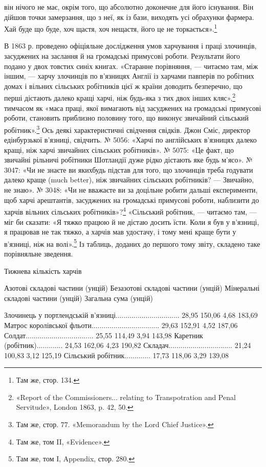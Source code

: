 \parcont{}  %
він нічого не має, окрім того, що абсолютно доконечне для його
існування. Він дійшов точки замерзання, що з неї, як із бази,
виходять усі обрахунки фармера. Хай буде що буде, хоч щастя,
хоч нещастя, його це не торкається».\footnote{
Там же, стор. 134.
}

В 1863 р. проведено офіціяльне дослідження умов харчування
і праці злочинців, засуджених на заслання й на громадські примусові
роботи. Результати його подано у двох товстих синіх
книгах. «Старанне порівняння, — читаємо там, між іншим, —
харчу злочинців по в’язницях Англії із харчами павперів по
робітних домах і вільних сільських робітників цієї ж країни
доводить безперечно, що перші дістають далеко кращі харчі,
ніж будь-яка з тих двох інших кляс»,\footnote{
«Report of the Commissioners... relating to Transpotration and
Penal Servitude», London 1863, p. 42, 50.
} тимчасом як «маса
праці, якої вимагають від засуджених на громадські примусові
роботи, становить приблизно половину того, що виконує звичайний
сільський робітник».\footnote{
Там же, стор. 77. «Memorandum by the Lord Chief Justice».
} Ось деякі характеристичні свідчення
свідків. Джон Сміс, директор едінбурзької в’язниці, свідчить.
№ 5056: «Харчі по англійських в’язницях далеко кращі, ніж
харчі звичайних сільських робітників». № 5075: «Це факт, що
звичайні рільничі робітники Шотландії дуже рідко дістають яке
будь м’ясо». № 3047: «Чи не знаєте ви якихбудь підстав для
того, що злочинців треба годувати далеко краще (much better),
ніж звичайних сільських робітників? — Звичайно, не знаю».
№ 3048: «Чи не вважаєте ви за доцільне робити дальші експерименти,
щоб харчі арештантів, засуджених на громадські примусові
роботи, наблизити до харчів вільних сільських робітників»?\footnote{
Там же, том II, «Evidence».
} «Сільський робітник, — читаємо там, — міг би сказати:
«Я тяжко працюю й не дістаю досить їсти. Коли я був у
в’язниці, я працював не так тяжко, а харчів мав удостачу, і тому
мені краще бути у в’язниці, ніж на волі».\footnote{
Там же, том I, Appendix, стор. 280.
} Із таблиць, доданих
до першого тому звіту, складено таке порівняльне зведення.

Тижнева кількість харчів

Азотові  складові  частини (унцій)
Безазотові  складові  частини (унцій)
Мінеральні  складові  частини (унцій)
Загальна  сума (унцій)

Злочинець у портлендській
в’язниці................................                28,95                150,06               
4,68                  183,69
Матрос королівської
фльоти..................................                29,63                152,91              
4,52                   187,06
Солдат..................................                25,55                114,49               
3,94                   143,98
Каретник (робітник).............                24,53                162,06                4,23     
             190,82
Складач................................                21,24                100,83               
3,12                   125,19
Сільський робітник.............                 17,73                 118,06                3,29    
              139,08
